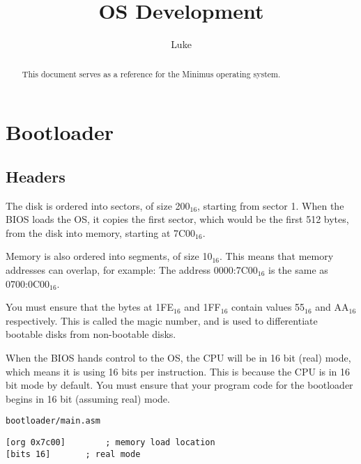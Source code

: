 \documentclass{article}
\title{OS Development}
\author{Luke}
\begin{document}
\maketitle

\begin{abstract}

This document serves as a reference for the Minimus operating system.

\end{abstract}

\newpage

\tableofcontents

\newpage

\section{Bootloader}

\subsection{Headers}

The disk is ordered into sectors, of size 200$_{16}$, starting from sector 1\cite{sector size}.
When the BIOS loads the OS, it copies the first sector,
which would be the first 512 bytes, from the disk into memory,
starting at 7C00$_{16}$\cite{7c00}.

Memory is also ordered into segments, of size 10$_{16}$\cite{memory segments}. This means that memory
addresses can overlap, for example:
The address 0000:7C00$_{16}$ is the same as 0700:0C00$_{16}$.

You must ensure that the bytes at 1FE$_{16}$ and 1FF$_{16}$
contain values 55$_{16}$ and AA$_{16}$ respectively\cite{55aa}.
This is called the magic number, and is used to differentiate
bootable disks from non-bootable disks.

When the BIOS hands control to the OS, the CPU will be in 16 bit (real) mode\cite{16bitstart},
which means it is using 16 bits per instruction. This is because the CPU is in
16 bit mode by default. You must ensure that your program code for the bootloader
begins in 16 bit (assuming real) mode.

\begin{verbatim}
bootloader/main.asm
\end{verbatim}
\begin{verbatim}
[org 0x7c00]		; memory load location
[bits 16]		; real mode
\end{verbatim}
\end{document}
